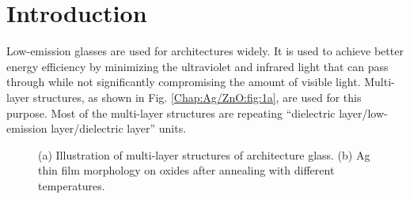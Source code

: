 \section{Introduction}

Low-emission glasses are used for architectures widely. It is used to achieve better energy efficiency by minimizing the ultraviolet and infrared light that can pass through while not significantly compromising the amount of visible light. Multi-layer structures, as shown in Fig. \ref{Chap:Ag/ZnO:fig:1a}, are used for this purpose. Most of the multi-layer structures are repeating ``dielectric layer/low-emission layer/dielectric layer'' units.

\begingroup
\begin{figure}[!ht]
  \centering
  \label{Chap:Ag/ZnO:fig:1a}
  \label{Chap:Ag/ZnO:fig:1b}
\caption[Illustration of multi-layer structures and thin film morphology]{(a) Illustration of multi-layer structures of architecture glass. (b) Ag thin film morphology on oxides after annealing with different temperatures. \cite{liu2013lithography}}
  \label{Chap:Ag/ZnO:fig1}
\end{figure}
\endgroup

